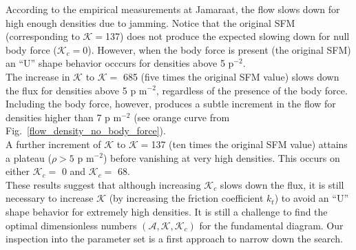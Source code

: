 \documentclass[preprint,12pt]{elsarticle}
\begin{document}
According to the empirical measurements at Jamaraat, the flow slows down for high enough densities due to jamming. Notice that the original SFM (corresponding to $\mathcal{K}=$137) does not produce the expected slowing down for null body force ($\mathcal{K}_c=$0). However, when the body force is present (the original SFM) an ``U'' shape behavior occcurs for densities above 5 p$^{-2}$.\\

The increase in $\mathcal{K}$ to $\mathcal{K} = $ 685 (five times the original SFM value) slows down  the flux for densities above 5 p m$^{-2}$, regardless of the presence of the body force. Including the body force, however, produces a subtle increment in the flow for densities higher than 7 p m$^{-2}$ (see orange curve from Fig.~\ref{flow_density_no_body_force}). \\

A further increment of $\mathcal{K}$ to $\mathcal{K}=$137 (ten times the original SFM value) attains a plateau ($\rho>5$ p m$^{-2}$) before vanishing at very high densities. This occurs on either $\mathcal{K}_c=$ 0 and $\mathcal{K}_c = $ 68.\\


These results suggest that although increasing $\mathcal{K}_c$ slows down the flux, it is still necessary to increase $\mathcal{K}$ (by increasing the friction coefficient $k_t$) to avoid an ``U'' shape behavior for extremely high densities. It is still a challenge to find the optimal dimensionless numbers  $(\mathcal{A},\mathcal{K},\mathcal{K}_c)$ for the fundamental diagram. Our inspection into the parameter set is a first approach to narrow down the search.\\
\end{document}
